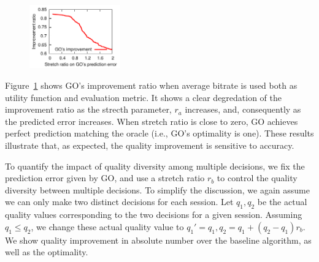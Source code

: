 \begin{figure}[h!]
\centering
 \includegraphics[width=0.35\textwidth] {figures/newfig/trendAccuracy-metricId1-keyGlobal-partition.pdf}
\label{fig:trace-accuracy-2}
\end{figure}

Figure~\ref{fig:trace-accuracy-2} shows GO's improvement ratio when
average bitrate is used both as utility function and evaluation
metric.  It shows a clear degredation of the improvement ratio as the
strecth parameter, $r_a$ increases, and, consequently as the predicted
error increases. When stretch ratio is close to zero, GO achieves
perfect prediction matching the oracle (i.e., GO's optimality is
one). 
These results illustrate that, as expected, the quality improvement is
sensitive to accuracy. 



\label{subsec:impact-diversity}

To quantify the impact of quality diversity among multiple decisions,
we fix the prediction error given by GO, and use a stretch ratio $r_b$
to control the quality diversity between multiple decisions. To
simplify the discussion, we again assume we can only make two distinct
decisions for each session. Let $q_1, q_2$ be the actual quality
values corresponding to the two decisions for a given
session. Assuming $q_1\leq q_2$, we change these actual quality value
to $q_1'=q_1, q_2=q_1+(q_2-q_1)r_b$. We show quality improvement in
absolute number over the baseline algorithm, as well as the
optimality.


